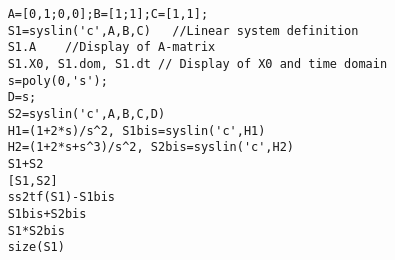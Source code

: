 \begin{examples}
  \begin{Verbatim}
    A=[0,1;0,0];B=[1;1];C=[1,1];
    S1=syslin('c',A,B,C)   //Linear system definition
    S1.A    //Display of A-matrix
    S1.X0, S1.dom, S1.dt // Display of X0 and time domain
    s=poly(0,'s');
    D=s;
    S2=syslin('c',A,B,C,D)
    H1=(1+2*s)/s^2, S1bis=syslin('c',H1)
    H2=(1+2*s+s^3)/s^2, S2bis=syslin('c',H2)
    S1+S2
    [S1,S2]
    ss2tf(S1)-S1bis
    S1bis+S2bis
    S1*S2bis
    size(S1)
  \end{Verbatim}
\end{examples}
\begin{manseealso}
           
\end{manseealso}
